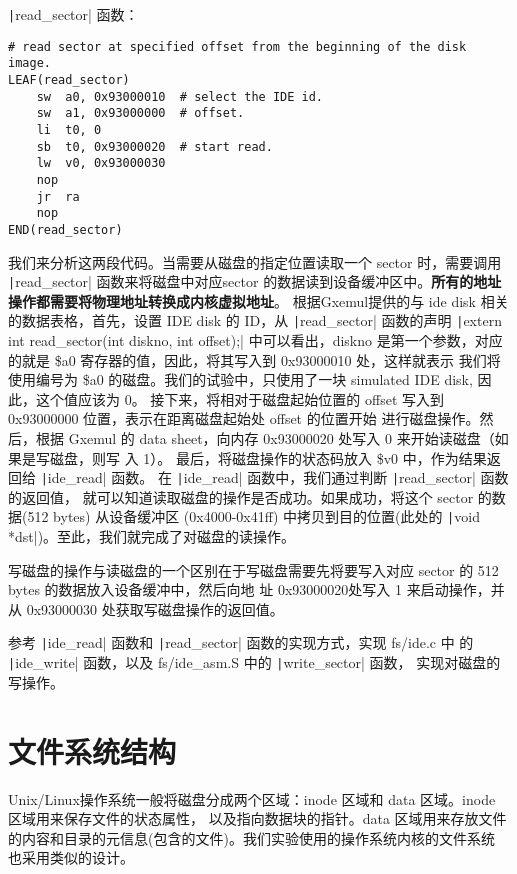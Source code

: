 \texttt|read_sector| 函数：

\begin{verbatim}
# read sector at specified offset from the beginning of the disk image.
LEAF(read_sector)
    sw  a0, 0x93000010  # select the IDE id.
    sw  a1, 0x93000000  # offset.
    li  t0, 0
    sb  t0, 0x93000020  # start read.
    lw  v0, 0x93000030
    nop
    jr  ra
    nop
END(read_sector)
\end{verbatim}

我们来分析这两段代码。当需要从磁盘的指定位置读取一个 sector 时，需要调用 \texttt|read_sector|
函数来将磁盘中对应sector 的数据读到设备缓冲区中。\textbf{所有的地址操作都需要将物理地址转换成内核虚拟地址}。
根据Gxemul提供的与 ide disk 相关的数据表格，首先，设置 IDE disk 的 ID，从
\texttt|read_sector| 函数的声明 \texttt|extern int read_sector(int diskno, int offset);|
中可以看出，diskno 是第一个参数，对应的就是 \$a0 寄存器的值，因此，将其写入到 0x93000010 处，这样就表示
我们将使用编号为 \$a0 的磁盘。我们的试验中，只使用了一块 simulated IDE disk, 因此，这个值应该为 0。
接下来，将相对于磁盘起始位置的 offset 写入到 0x93000000 位置，表示在距离磁盘起始处 offset 的位置开始
进行磁盘操作。然后，根据 Gxemul 的 data sheet，向内存 0x93000020 处写入 0 来开始读磁盘（如果是写磁盘，则写
入 1）。
最后，将磁盘操作的状态码放入 \$v0 中，作为结果返回给 \texttt|ide_read| 函数。
在 \texttt|ide_read| 函数中，我们通过判断 \texttt|read_sector| 函数的返回值，
就可以知道读取磁盘的操作是否成功。如果成功，将这个 sector 的数据(512 bytes) 从设备缓冲区 (0x4000-0x41ff) 
中拷贝到目的位置(此处的 \texttt|void *dst|)。至此，我们就完成了对磁盘的读操作。

写磁盘的操作与读磁盘的一个区别在于写磁盘需要先将要写入对应 sector 的 512 bytes 的数据放入设备缓冲中，然后向地
址 0x93000020处写入 1 来启动操作，并从 0x93000030 处获取写磁盘操作的返回值。

\begin{exercise}
参考 \texttt|ide_read| 函数和 \texttt|read_sector| 函数的实现方式，实现 fs/ide.c 中
的 \texttt|ide_write| 函数，以及 fs/ide\_asm.S 中的 \texttt|write_sector| 函数，
实现对磁盘的写操作。
\end{exercise}

\section{文件系统结构}

\begin{note}
Unix/Linux操作系统一般将磁盘分成两个区域：inode 区域和 data 区域。inode 区域用来保存文件的状态属性，
以及指向数据块的指针。data 区域用来存放文件的内容和目录的元信息(包含的文件)。我们实验使用的操作系统内核的文件系统
也采用类似的设计。
\end{note}

